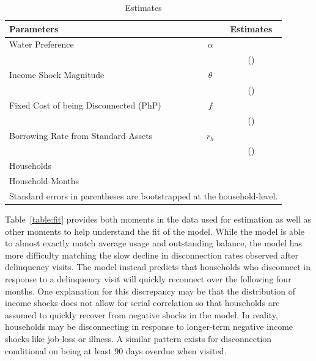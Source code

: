 \documentclass[12pt]{article}
\begin{document}
\begin{table}[h!]
\centering
\caption{Estimates}\label{table:estimates}
\vspace{-2mm}
\begin{tabular}{l*{1}{cc}}
\toprule
Parameters  &   & Estimates \\
\midrule
Water Preference & $\alpha$ &  \\
 &  & (\unskip) \\[.4em]
Income Shock Magnitude & $\theta$ &  \\
 &  & (\unskip) \\[.4em]
Fixed Cost of being Disconnected (PhP) & $f$ &   \\
 &  &  (\unskip) \\[.4em]
Borrowing Rate from Standard Assets & $r_h$ &  \\
 &  & (\unskip) \\[.8em]
Households & &  \\
Household-Months & &  \\
\bottomrule
\multicolumn{3}{l}{\scriptsize Standard errors in parentheses are bootstrapped at the household-level.} %
\end{tabular}
\end{table}

Table~\ref{table:fit} provides both moments in the data used for estimation as well as other moments to help understand the fit of the model.  While the model is able to almost exactly match average usage and outstanding balance, the model has more difficulty matching the slow decline in disconnection rates observed after delinquency visits.  The model instead predicts that households who disconnect in response to a delinquency visit will quickly reconnect over the following four months.  One explanation for this discrepancy may be that the distribution of income shocks does not allow for serial correlation so that households are assumed to quickly recover from negative shocks in the model.  In reality, households may be disconnecting in response to longer-term negative income shocks like job-loss or illness.  A similar pattern exists for disconnection conditional on being at least 90 days overdue when visited.
\end{document}
